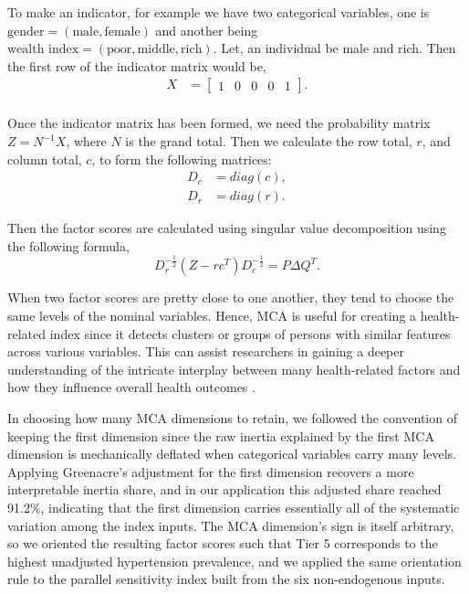 \documentclass[
  12pt,
  a4paper]{article}
\begin{document}
To make an indicator, for example we have two categorical variables, one is \(\text{gender} = (\text{male}, \text{female})\) and another being \(\text{wealth index} = (\text{poor} , \text{middle}, \text{rich})\). Let, an individual be male and rich. Then the first row of the indicator matrix would be,
\[\begin{aligned}
X &= \begin{bmatrix}
          1 & 0 & 0 & 0 & 1
       \end{bmatrix}. \\
\end{aligned}\]

Once the indicator matrix has been formed, we need the probability matrix \(Z =  N^{-1}X\), where \(N\) is the grand total. Then we calculate the row total, \(r\), and column total, \(c\), to form the following matrices:
\[\begin{aligned} D_{c} &= diag(c),\\
D_{r} &= diag(r). \end{aligned} \]

Then the factor scores are calculated using singular value decomposition using the following formula,
\[D_r^{-\frac{1}{2}}(Z - rc^T )D_c^{-\frac{1}{2}} = P \Delta Q^T. \]

When two factor scores are pretty close to one another, they tend to choose the same levels of the nominal variables. Hence, MCA is useful for creating a health-related index since it detects clusters or groups of persons with similar features across various variables. This can assist researchers in gaining a deeper understanding of the intricate interplay between many health-related factors and how they influence overall health outcomes \citep{abdi2007multiple}.

In choosing how many MCA dimensions to retain, we followed the convention of keeping the first dimension since the raw inertia explained by the first MCA dimension is mechanically deflated when categorical variables carry many levels. Applying Greenacre's adjustment for the first dimension recovers a more interpretable inertia share, and in our application this adjusted share reached 91.2\%, indicating that the first dimension carries essentially all of the systematic variation among the index inputs. The MCA dimension's sign is itself arbitrary, so we oriented the resulting factor scores such that Tier 5 corresponds to the highest unadjusted hypertension prevalence, and we applied the same orientation rule to the parallel sensitivity index built from the six non-endogenous inputs.
\end{document}
